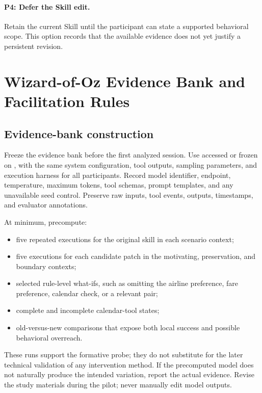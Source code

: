 \paragraph{P4: Defer the Skill edit.}
Retain the current Skill until the participant can state a supported behavioral
scope. This option records that the available evidence does not yet justify a
persistent revision.

\section{Wizard-of-Oz Evidence Bank and Facilitation Rules}
\label{app:wizard}

\subsection{Evidence-bank construction}

Freeze the evidence bank before the first analyzed session. Use
\ModelVersion{} accessed or frozen on \ModelDate{}, with the same system
configuration, tool outputs, sampling parameters, and execution harness for all
participants. Record model identifier, endpoint, temperature, maximum tokens,
tool schemas, prompt templates, and any unavailable seed control. Preserve raw
inputs, tool events, outputs, timestamps, and evaluator annotations.

At minimum, precompute:

\begin{itemize}[leftmargin=*]
    \item five repeated executions for the original skill in each scenario
    context;
    \item five executions for each candidate patch in the motivating,
    preservation, and boundary contexts;
    \item selected rule-level what-ifs, such as omitting the airline preference,
    fare preference, calendar check, or a relevant pair;
    \item complete and incomplete calendar-tool states;
    \item old-versus-new comparisons that expose both local success and possible
    behavioral overreach.
\end{itemize}

These runs support the formative probe; they do not substitute for the later
technical validation of any intervention method. If the precomputed model does
not naturally produce the intended variation, report the actual evidence.
Revise the study materials during the pilot; never manually edit model outputs.


